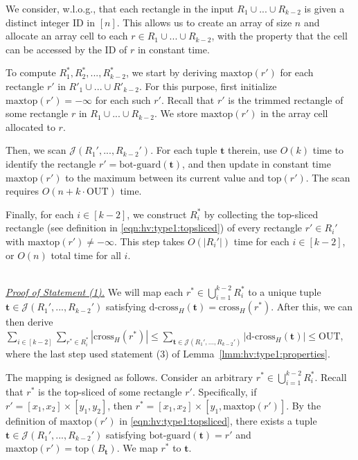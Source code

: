 \documentclass[sigconf]{acmart}
\def\vgap{\vspace{0mm}}
\def\extraspacing{\vspace{1.5mm} \noindent}
\def\J{\mathcal{J}}
\def\ytop{\mathrm{top}}
\def\maxtop{\mathrm{maxtop}}
\def\gbot{\mathrm{bot\text{-}guard}}
\def\cross{\mathrm{cross}}
\def\dcross{\mathrm{d\text{-}cross}}
\def\out{\mathrm{OUT}}
\begin{document}
{{{\extraspacing {\bf Computing $\bm{R^*_1, R^*_2, ..., R^*_{k-2}}$.} We consider, w.l.o.g., that each rectangle in the input $R_1 \cup ... \cup R_{k-2}$ is given a distinct integer ID in $[n]$. This allows us to create an array of size $n$ and allocate an array cell to each $r \in R_1 \cup ... \cup R_{k-2}$, with the property that the cell can be accessed by the ID of $r$ in constant time.

\vgap

To compute $R^*_1, R^*_2, ..., R^*_{k-2}$, we start by deriving $\maxtop(r')$ for each rectangle $r'$ in $R'_1 \cup  ... \cup R'_{k-2}$. For this purpose, first initialize $\maxtop(r') = -\infty$ for each such $r'$. Recall that $r'$ is the trimmed rectangle of some rectangle $r$ in $R_1 \cup ... \cup R_{k-2}$. We store $\maxtop(r')$ in the array cell allocated to $r$.

\vgap

Then, we scan $\J(R_1',...,R_{k-2}')$. For each tuple $\bm{t}$ therein, use $O(k)$ time to identify the rectangle $r' = \gbot(\bm{t})$, and then update in constant time $\maxtop(r')$ to the maximum between its current value and $\ytop(r')$. The scan requires $O(n + k \cdot \out)$ time.

\vgap

Finally, for each $i \in [k-2]$, we construct $R_i^*$ by collecting the top-sliced rectangle (see definition in \eqref{eqn:hv:type1:topsliced}) of every rectangle $r' \in R_i'$ with $\maxtop(r') \neq -\infty$. This step takes $O(|R_i'|)$ time for each $i \in [k-2]$, or $O(n)$ total time for all $i$.

\extraspacing {\bf Proof of Lemma~\ref{lmm:hv:type1:cross-r*}.} \\
\underline{\em Proof of Statement (1).} We will map each $r^*\in \bigcup_{i = 1}^{k-2} R_i^*$ to a unique tuple $\bm{t}\in \J(R_1',...,R_{k-2}')$ satisfying $\dcross_H(\bm{t}) = \cross_H(r^*)$. After this, we can then derive $\sum_{i\in[k-2]}\sum_{r^*\in R_i^*} |\cross_H(r^*)| \leq \sum_{\bm{t}\in \J(R_1',...,R_{k-2}')}|\dcross_H(\bm{t})|\leq \out$, where the last step used  statement (3) of Lemma~\ref{lmm:hv:type1:properties}.

\vgap

The mapping is designed as follows. Consider an arbitrary $r^*\in \bigcup_{i = 1}^{k-2} R_i^*$. Recall that $r^*$ is the top-sliced of some rectangle $r'$. Specifically, if $r' = [x_1,x_2]\times [y_1,y_2]$, then $r^* = [x_1,x_2]\times [y_1,\maxtop(r')]$. By the definition of $\maxtop(r')$ in \eqref{eqn:hv:type1:topsliced}, there exists a tuple $\bm{t}\in \J(R_1',...,R_{k-2}')$ satisfying $\gbot(\bm{t}) = r'$ and $\maxtop(r') = \ytop(B_{\bm{t}})$. We map $r^*$ to $\bm{t}$.

}}}
\end{document}
